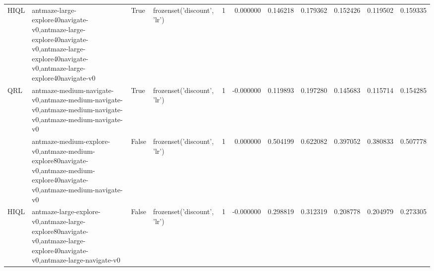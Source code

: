 \begin{tabular}{llllrrrrrrr}
\cline{1-11} \cline{2-11} \cline{3-11}
HIQL & antmaze-large-explore40navigate-v0,antmaze-large-explore40navigate-v0,antmaze-large-explore40navigate-v0,antmaze-large-explore40navigate-v0 & True & frozenset({'discount', 'lr'}) & 1 & 0.000000 & 0.146218 & 0.179362 & 0.152426 & 0.119502 & 0.159335 \\
\cline{1-11} \cline{2-11} \cline{3-11}
\multirow[t]{2}{*}{QRL} & antmaze-medium-navigate-v0,antmaze-medium-navigate-v0,antmaze-medium-navigate-v0,antmaze-medium-navigate-v0 & True & frozenset({'discount', 'lr'}) & 1 & -0.000000 & 0.119893 & 0.197280 & 0.145683 & 0.115714 & 0.154285 \\
\cline{2-11} \cline{3-11}
 & antmaze-medium-explore-v0,antmaze-medium-explore80navigate-v0,antmaze-medium-explore40navigate-v0,antmaze-medium-navigate-v0 & False & frozenset({'discount', 'lr'}) & 1 & 0.000000 & 0.504199 & 0.622082 & 0.397052 & 0.380833 & 0.507778 \\
\cline{1-11} \cline{2-11} \cline{3-11}
HIQL & antmaze-large-explore-v0,antmaze-large-explore80navigate-v0,antmaze-large-explore40navigate-v0,antmaze-large-navigate-v0 & False & frozenset({'discount', 'lr'}) & 1 & -0.000000 & 0.298819 & 0.312319 & 0.208778 & 0.204979 & 0.273305 \\
\cline{1-11} \cline{2-11} \cline{3-11}
\bottomrule
\end{tabular}
